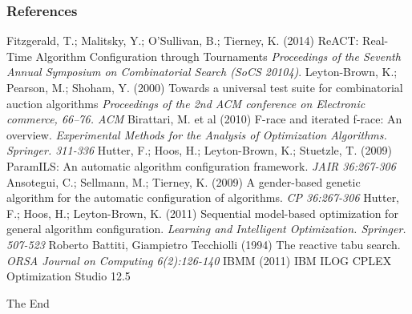 \documentclass[10pt,handout]{beamer}
\begin{document}

\begin{frame}
\frametitle{References}
\footnotesize{
\begin{thebibliography}{99} %
 Fitzgerald, T.; Malitsky, Y.; O'Sullivan, B.;
Tierney, K. (2014)
\newblock ReACT: Real-Time Algorithm Configuration through Tournaments
\newblock \emph{Proceedings of the Seventh Annual Symposium on Combinatorial
Search (SoCS 20104)}.
 Leyton-Brown, K.;
Pearson, M.; Shoham, Y. (2000)
\newblock Towards a universal test suite for combinatorial auction algorithms
\newblock \emph{Proceedings of the 2nd ACM conference on Electronic commerce,
66–76. ACM}
 Birattari, M. et al (2010)
\newblock F-race and iterated f-race: An overview.
\newblock \emph{Experimental Methods for the Analysis of Optimization 
Algorithms. Springer. 311-336}
 Hutter, F.; Hoos, H.; Leyton-Brown, K.; Stuetzle, T.
(2009)
\newblock ParamILS: An automatic algorithm configuration framework.
\newblock \emph{JAIR 36:267-306}
 Ansotegui, C.; Sellmann, M.; Tierney, K. (2009)
\newblock A gender-based genetic algorithm for the automatic configuration of
algorithms.
\newblock \emph{CP 36:267-306}
 Hutter, F.; Hoos, H.; Leyton-Brown, K. (2011)
\newblock Sequential model-based optimization for general algorithm 
configuration.
\newblock \emph{Learning and Intelligent Optimization. Springer. 507-523}
 Roberto Battiti, Giampietro Tecchiolli (1994)
\newblock The reactive tabu search.
\newblock \emph{ORSA Journal on Computing 6(2):126-140}
 IBMM (2011)
\newblock IBM ILOG CPLEX Optimization Studio 12.5

\end{thebibliography}
}
\end{frame}







\begin{frame}
\Huge{\centerline{The End}}

\end{frame}


			
\end{document}
